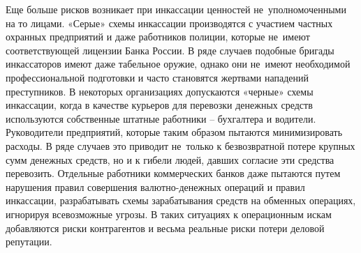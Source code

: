 \documentclass[a4paper,12pt,fleqn]{article} %
\begin{document}
Еще больше рисков возникает при инкассации ценностей не~уполномоченными на то лицами. «Серые» схемы инкассации производятся с участием частных охранных предприятий и даже работников полиции, которые не~имеют соответствующей лицензии Банка России. В ряде случаев подобные бригады инкассаторов имеют даже табельное оружие, однако они не~имеют необходимой профессиональной подготовки и часто становятся жертвами нападений преступников. В некоторых организациях допускаются «черные» схемы инкассации, когда в качестве курьеров для перевозки денежных средств используются собственные штатные работники – бухгалтера и водители. Руководители предприятий, которые таким образом пытаются минимизировать расходы. В ряде случаев это приводит не~только к безвозвратной потере крупных сумм денежных средств, но и к гибели людей, давших согласие эти средства перевозить. Отдельные работники коммерческих банков даже пытаются путем нарушения правил совершения валютно-денежных операций и правил инкассации, разрабатывать схемы зарабатывания средств на обменных операциях, игнорируя всевозможные угрозы. В таких ситуациях к операционным искам добавляются риски контрагентов и весьма реальные риски потери деловой репутации.\\
	
\end{document}
